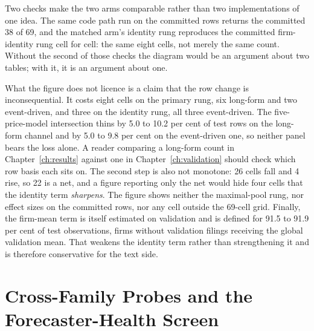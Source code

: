 Two checks make the two arms comparable rather than two implementations of one
idea. The same code path run on the committed rows returns the committed 38 of
69, and the matched arm's identity rung reproduces the committed
firm-identity rung cell for cell: the same eight cells, not merely the same
count. %
Without the second of those checks the diagram would be an argument about two
tables; with it, it is an argument about one.

What the figure does not licence is a claim that the row change is
inconsequential. It costs eight cells on the primary rung, six long-form and
two event-driven, and three on the identity rung, all three event-driven. The
five-price-model intersection thins by 5.0 to 10.2 per cent of test rows on
the long-form channel and by 5.0 to 9.8 per cent on the event-driven one, so
neither panel bears the loss alone. %
A reader comparing a long-form count in Chapter~\ref{ch:results} against one
in Chapter~\ref{ch:validation} should check which row basis each sits on.
The second step is also not
monotone: 26 cells fall and 4 rise, so 22 is a net, and a figure reporting
only the net would hide four cells that the identity term \emph{sharpens}. The
figure shows neither the maximal-pool rung, nor effect sizes on the committed
rows, nor any cell outside the 69-cell grid. Finally, the firm-mean term is
itself estimated on validation and is defined for 91.5 to 91.9 per cent of
test observations, firms without validation filings receiving the global
validation mean. %
That weakens the identity term rather than strengthening
it and is therefore conservative for the text side.

\clearpage

\FloatBarrier
\section{Cross-Family Probes and the Forecaster-Health Screen}
\label{app:res-crossfamily}

